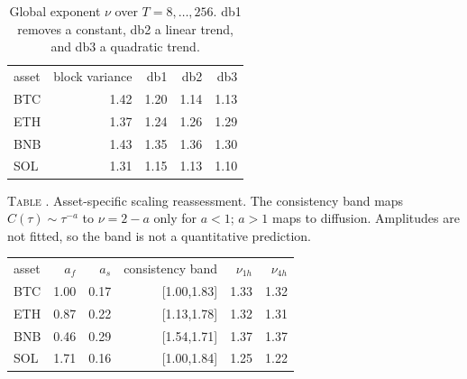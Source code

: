 \begin{table}[!htbp]
\caption{Global exponent $\nu$ over $T=8,\ldots,256$. db1 removes a constant, db2 a linear trend, and db3 a quadratic trend.}
\label{tab:supp-wavelets}
\begin{ruledtabular}
\begin{tabular}{lrrrr}
asset & block variance & db1 & db2 & db3 \\
\colrule
BTC & 1.42 & 1.20 & 1.14 & 1.13 \\
ETH & 1.37 & 1.24 & 1.26 & 1.29 \\
BNB & 1.43 & 1.35 & 1.36 & 1.30 \\
SOL & 1.31 & 1.15 & 1.13 & 1.10 \\
\end{tabular}
\end{ruledtabular}
\end{table}

\FloatBarrier
{}
\label{tab:supp-scaling}
\noindent\textsc{Table \thetable.} Asset-specific scaling reassessment. The consistency band maps $C(\tau)\sim\tau^{-a}$ to $\nu=2-a$ only for $a<1$; $a>1$ maps to diffusion. Amplitudes are not fitted, so the band is not a quantitative prediction.
\begin{center}
\begin{ruledtabular}
\begin{tabular}{lrrrrr}
asset & $a_f$ & $a_s$ & consistency band & $\nu_{1h}$ & $\nu_{4h}$ \\
\colrule
BTC & 1.00 & 0.17 & [1.00,1.83] & 1.33 & 1.32 \\
ETH & 0.87 & 0.22 & [1.13,1.78] & 1.32 & 1.31 \\
BNB & 0.46 & 0.29 & [1.54,1.71] & 1.37 & 1.37 \\
SOL & 1.71 & 0.16 & [1.00,1.84] & 1.25 & 1.22 \\
\end{tabular}
\end{ruledtabular}
\end{center}

